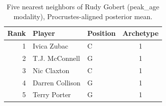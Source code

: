 \begin{table}[htbp]
  \centering\small
  \begin{tabular}{rllc}
    \toprule
    Rank & Player & Position & Archetype \\
    \midrule
    1 & Ivica Zubac & C & 1 \\
    2 & T.J. McConnell & G & 1 \\
    3 & Nic Claxton & C & 1 \\
    4 & Darren Collison & G & 1 \\
    5 & Terry Porter & G & 1 \\
    \bottomrule
  \end{tabular}
  \caption{Five nearest neighbors of Rudy Gobert (peak_age modality), Procrustes-aligned posterior mean.}
  \label{tab:Rudy_Gobert_neighbors_peak_age}
\end{table}

